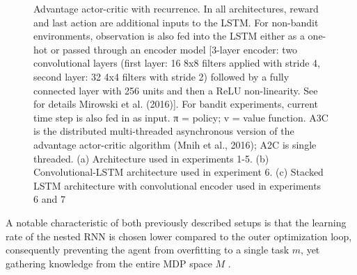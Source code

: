 \documentclass[letterpaper, 10 pt, conference]{ieeeconf}  %
\begin{document}
\begin{figure}[thpb]
        \centering
  \caption{Advantage actor-critic with recurrence. In all architectures, reward and last action are additional inputs
        to the LSTM. For non-bandit environments, observation is also fed into the LSTM either as a one-hot or passed
        through an encoder model [3-layer encoder: two convolutional layers (first layer: 16 8x8 filters applied with
        stride 4, second layer: 32 4x4 filters with stride 2) followed by a fully connected layer with 256 units and then a
        ReLU non-linearity. See for details Mirowski et al. (2016)]. For bandit experiments, current time step is also
        fed in as input. π = policy; v = value function. A3C is the distributed multi-threaded asynchronous version
        of the advantage actor-critic algorithm (Mnih et al., 2016); A2C is single threaded. (a) Architecture used in
        experiments 1-5. (b) Convolutional-LSTM architecture used in experiment 6. (c) Stacked LSTM architecture
        with convolutional encoder used in experiments 6 and 7 \cite{wangLearningReinforcementLearn2016}}
        \label{figurelabel}
     \end{figure}
  

A notable characteristic of both previously described setups is that the learning rate of the nested RNN is chosen lower compared 
to the outer optimization loop, consequently preventing
the agent from overfitting to a single task $m$, yet gathering knowledge from the entire MDP space $M$ 
\cite{botvinickReinforcementLearningFast2019}.\newline
\end{document}
